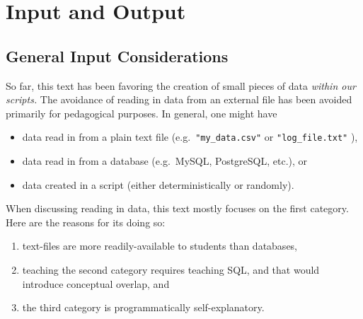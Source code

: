 \documentclass[12pt,krantz2]{krantz}
\providecommand{\tightlist}{%
  \setlength{\itemsep}{0pt}\setlength{\parskip}{0pt}}
\begin{document}
\hypertarget{input-and-output}{%
\chapter{Input and Output}\label{input-and-output}}

\hypertarget{general-input-considerations}{%
\section{General Input Considerations}\label{general-input-considerations}}

So far, this text has been favoring the creation of small pieces of data \emph{within our scripts.} The avoidance of reading in data from an external file has been avoided primarily for pedagogical purposes. In general, one might have

\begin{itemize}
\tightlist
\item
  data read in from a plain text file (e.g.~\texttt{"my\_data.csv"} or \texttt{"log\_file.txt"} ),
\item
  data read in from a database (e.g.~MySQL, PostgreSQL, etc.), or
\item
  data created in a script (either deterministically or randomly).
\end{itemize}

When discussing reading in data, this text mostly focuses on the first category. Here are the reasons for its doing so:

\begin{enumerate}
\def\labelenumi{\arabic{enumi}.}
\tightlist
\item
  text-files are more readily-available to students than databases,
\item
  teaching the second category requires teaching SQL, and that would introduce conceptual overlap, and
\item
  the third category is programmatically self-explanatory.
\end{enumerate}
\end{document}
